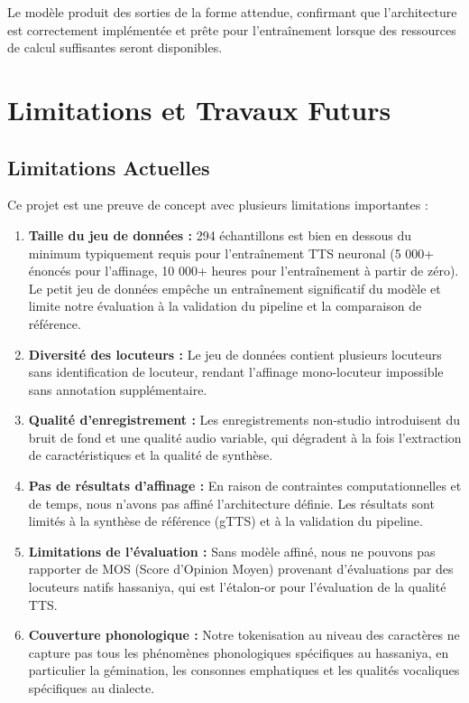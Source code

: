 \documentclass[12pt,a4paper]{article}
\begin{document}
Le modèle produit des sorties de la forme attendue, confirmant que l'architecture est correctement implémentée et prête pour l'entraînement lorsque des ressources de calcul suffisantes seront disponibles.

\section{Limitations et Travaux Futurs}
\label{sec:limitations}

\subsection{Limitations Actuelles}

Ce projet est une preuve de concept avec plusieurs limitations importantes :

\begin{enumerate}
    \item \textbf{Taille du jeu de données :} 294 échantillons est bien en dessous du minimum typiquement requis pour l'entraînement TTS neuronal (5 000+ énoncés pour l'affinage, 10 000+ heures pour l'entraînement à partir de zéro). Le petit jeu de données empêche un entraînement significatif du modèle et limite notre évaluation à la validation du pipeline et la comparaison de référence.

    \item \textbf{Diversité des locuteurs :} Le jeu de données contient plusieurs locuteurs sans identification de locuteur, rendant l'affinage mono-locuteur impossible sans annotation supplémentaire.

    \item \textbf{Qualité d'enregistrement :} Les enregistrements non-studio introduisent du bruit de fond et une qualité audio variable, qui dégradent à la fois l'extraction de caractéristiques et la qualité de synthèse.

    \item \textbf{Pas de résultats d'affinage :} En raison de contraintes computationnelles et de temps, nous n'avons pas affiné l'architecture définie. Les résultats sont limités à la synthèse de référence (gTTS) et à la validation du pipeline.

    \item \textbf{Limitations de l'évaluation :} Sans modèle affiné, nous ne pouvons pas rapporter de MOS (Score d'Opinion Moyen) provenant d'évaluations par des locuteurs natifs hassaniya, qui est l'étalon-or pour l'évaluation de la qualité TTS.

    \item \textbf{Couverture phonologique :} Notre tokenisation au niveau des caractères ne capture pas tous les phénomènes phonologiques spécifiques au hassaniya, en particulier la gémination, les consonnes emphatiques et les qualités vocaliques spécifiques au dialecte.
\end{enumerate}
\end{document}
